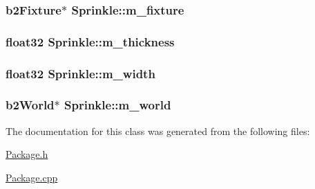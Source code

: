 \hypertarget{classSprinkle_a7f750bc32d346c4fde415b4d8722e344}{
\subsubsection[{m\-\_\-fixture}]{\setlength{\rightskip}{0pt plus 5cm}b2\-Fixture$\ast$ Sprinkle\-::m\-\_\-fixture\hspace{0.3cm}{\ttfamily [private]}}}\label{classSprinkle_a7f750bc32d346c4fde415b4d8722e344}
\hypertarget{classSprinkle_a973d70d3285539af9f7d2345ec29eeab}{
\subsubsection[{m\-\_\-thickness}]{\setlength{\rightskip}{0pt plus 5cm}float32 Sprinkle\-::m\-\_\-thickness\hspace{0.3cm}{\ttfamily [private]}}}\label{classSprinkle_a973d70d3285539af9f7d2345ec29eeab}
\hypertarget{classSprinkle_a41962d16aa3eae840e9a32ecd0f2027d}{
\subsubsection[{m\-\_\-width}]{\setlength{\rightskip}{0pt plus 5cm}float32 Sprinkle\-::m\-\_\-width\hspace{0.3cm}{\ttfamily [private]}}}\label{classSprinkle_a41962d16aa3eae840e9a32ecd0f2027d}
\hypertarget{classSprinkle_af727f24bec3c2bba8d04f682858207d4}{
\subsubsection[{m\-\_\-world}]{\setlength{\rightskip}{0pt plus 5cm}b2\-World$\ast$ Sprinkle\-::m\-\_\-world\hspace{0.3cm}{\ttfamily [private]}}}\label{classSprinkle_af727f24bec3c2bba8d04f682858207d4}


The documentation for this class was generated from the following files\-:\begin{DoxyCompactItemize}
\item 
\hyperlink{Package_8h}{Package.\-h}\item 
\hyperlink{Package_8cpp}{Package.\-cpp}\end{DoxyCompactItemize}
